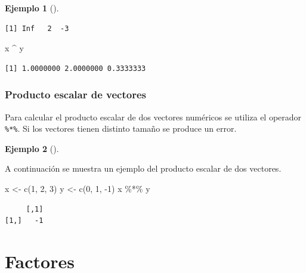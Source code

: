 \documentclass[
  a4paper,
]{scrreport}
\newenvironment{Shaded}{\begin{snugshade}}{\end{snugshade}}
\newcommand{\DecValTok}[1]{\textcolor[rgb]{0.68,0.00,0.00}{#1}}
\newcommand{\FunctionTok}[1]{\textcolor[rgb]{0.28,0.35,0.67}{#1}}
\newcommand{\NormalTok}[1]{\textcolor[rgb]{0.00,0.23,0.31}{#1}}
\newcommand{\OtherTok}[1]{\textcolor[rgb]{0.00,0.23,0.31}{#1}}
\newcommand{\SpecialCharTok}[1]{\textcolor[rgb]{0.37,0.37,0.37}{#1}}
\theoremstyle{definition}
\newtheorem{example}{Ejemplo}[chapter]
\theoremstyle{definition}
\theoremstyle{remark}
\begin{document}
\begin{example}[]
\begin{verbatim}
[1] Inf   2  -3
\end{verbatim}

\begin{Shaded}
\begin{Highlighting}[]
\NormalTok{x }\SpecialCharTok{\^{}}\NormalTok{ y}
\end{Highlighting}
\end{Shaded}

\begin{verbatim}
[1] 1.0000000 2.0000000 0.3333333
\end{verbatim}

\end{example}

\hypertarget{producto-escalar-de-vectores}{%
\subsubsection{Producto escalar de
vectores}\label{producto-escalar-de-vectores}}

Para calcular el producto escalar de dos vectores numéricos se utiliza
el operador \texttt{\%*\%}. Si los vectores tienen distinto tamaño se
produce un error.

\leavevmode{}%
\begin{example}[]\label{exm-producto-escalar}

A continuación se muestra un ejemplo del producto escalar de dos
vectores.

\begin{Shaded}
\begin{Highlighting}[]
\NormalTok{x }\OtherTok{\textless{}{-}} \FunctionTok{c}\NormalTok{(}\DecValTok{1}\NormalTok{, }\DecValTok{2}\NormalTok{, }\DecValTok{3}\NormalTok{)}
\NormalTok{y }\OtherTok{\textless{}{-}} \FunctionTok{c}\NormalTok{(}\DecValTok{0}\NormalTok{, }\DecValTok{1}\NormalTok{, }\SpecialCharTok{{-}}\DecValTok{1}\NormalTok{)}
\NormalTok{x }\SpecialCharTok{\%*\%}\NormalTok{ y}
\end{Highlighting}
\end{Shaded}

\begin{verbatim}
     [,1]
[1,]   -1
\end{verbatim}

\end{example}

\hypertarget{factores}{%
\section{Factores}\label{factores}}
\end{document}
